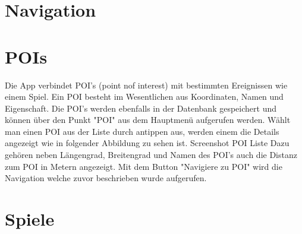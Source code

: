 \section{Navigation}

\section{POIs}
Die App verbindet POI's (point nof interest)  mit bestimmten Ereignissen wie einem Spiel. Ein POI besteht im Wesentlichen aus Koordinaten, Namen und Eigenschaft.  Die POI's werden ebenfalls in der Datenbank gespeichert und können über den Punkt "POI" aus dem Hauptmenü aufgerufen werden. Wählt man einen POI aus der Liste durch antippen aus, werden einem die Details angezeigt wie in folgender Abbildung zu sehen ist.
\TODO Screenshot POI Liste
Dazu gehören neben Längengrad, Breitengrad und Namen des POI's auch die Distanz zum POI in Metern angezeigt. Mit dem Button "Navigiere zu POI" wird die Navigation welche zuvor beschrieben wurde aufgerufen.

\section{Spiele}



